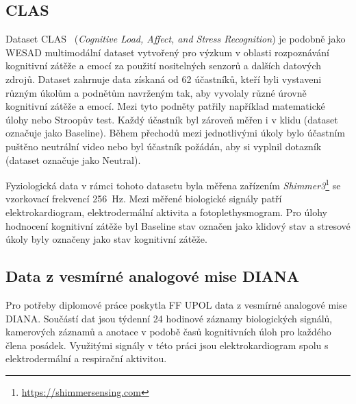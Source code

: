 \subsection{CLAS}
\label{subsec:clas}
Dataset CLAS~\cite{clasDataset} (\textit{Cognitive Load, Affect, and Stress
Recognition}) je podobně jako WESAD multimodální dataset vytvořený pro výzkum v
oblasti rozpoznávání kognitivní zátěže a emocí za použití nositelných senzorů a
dalších datových zdrojů. Dataset zahrnuje data získaná od 62 účastníků, kteří
byli vystaveni různým úkolům a podnětům navrženým tak, aby vyvolaly různé úrovně
kognitivní zátěže a emocí. Mezi tyto podněty patřily například matematické úlohy
nebo Stroopův test. Každý účastník byl zároveň měřen i v klidu (dataset označuje
jako Baseline). Během přechodů mezi jednotlivými úkoly bylo účastním puštěno
neutrální video nebo byl účastník požádán, aby si vyplnil dotazník (dataset
označuje jako Neutral). 

Fyziologická data v rámci tohoto datasetu byla měřena zařízením
\textit{Shimmer3}\footnote{\url{https://shimmersensing.com}} se vzorkovací
frekvencí 256~Hz. Mezi měřené biologické signály patří elektrokardiogram,
elektrodermální aktivita a fotoplethysmogram. Pro úlohy hodnocení kognitivní
zátěže byl Baseline stav označen jako klidový stav a stresové úkoly byly
označeny jako stav kognitivní zátěže. 

\subsection{Data z vesmírné analogové mise DIANA}
\label{subsec:data_diana}
Pro potřeby diplomové práce poskytla \gls{FF UPOL} data z vesmírné analogové
mise DIANA. Součástí dat jsou týdenní 24 hodinové záznamy biologických signálů,
kamerových záznamů a anotace v podobě časů kognitivních úloh pro každého člena
posádek. Využitými signály v této práci jsou elektrokardiogram spolu s
elektrodermální a respirační aktivitou.